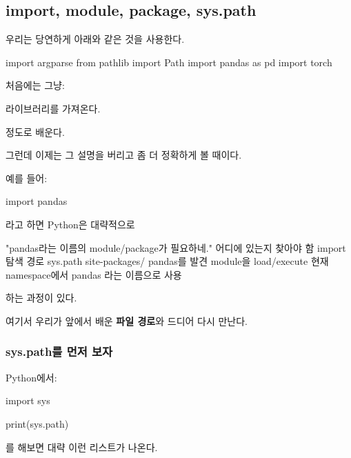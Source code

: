 


\subsection{import, module, package, sys.path}

우리는 당연하게 아래와 같은 것을 사용한다.

\begin{dhkcode}
import argparse
from pathlib import Path
import pandas as pd
import torch
\end{dhkcode}

처음에는 그냥:

\begin{dhksmry}[centered]
라이브러리를 가져온다.
\end{dhksmry}

정도로 배운다.

그런데 이제는 그 설명을 버리고 좀 더 정확하게 볼 때이다.

예를 들어:

\begin{dhkcode}
import pandas
\end{dhkcode}

라고 하면 Python은 대략적으로

\begin{dhksmry}[centered]
"pandas라는 이름의 module/package가 필요하네."
\da
어디에 있는지 찾아야 함
\da
import 탐색 경로
\da
sys.path
\da
site-packages/
\da
pandas를 발견
\da
module을 load/execute
\da
현재 namespace에서 pandas 라는 이름으로 사용
\end{dhksmry}

하는 과정이 있다.

여기서 우리가 앞에서 배운 \textbf{파일 경로}와 드디어 다시 만난다.

\subsubsection{sys.path를 먼저 보자}

Python에서:

\begin{dhkcode}
import sys

print(sys.path)
\end{dhkcode}

를 해보면 대략 이런 리스트가 나온다.

